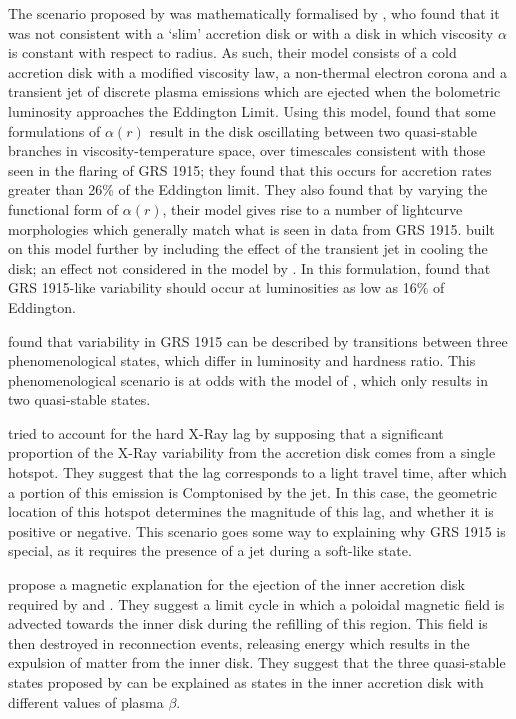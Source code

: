 \par The scenario proposed by \citealp{Belloni_Model1} was mathematically formalised by \citealp{Nayakshin_GRSModel}, who found that it was not consistent with a `slim' accretion disk \citep{Abramowicz_Slim} or with a disk in which viscosity $\alpha$ is constant with respect to radius.  As such, their model consists of a cold accretion disk with a modified viscosity law, a non-thermal electron corona and a transient jet of discrete plasma emissions which are ejected when the bolometric luminosity approaches the Eddington Limit.  Using this model, \citealp{Nayakshin_GRSModel} found that some formulations of $\alpha(r)$ result in the disk oscillating between two quasi-stable branches in viscosity-temperature space, over timescales consistent with those seen in the flaring of GRS 1915; they found that this occurs for accretion rates greater than 26\% of the Eddington limit.  They also found that by varying the functional form of $\alpha(r)$, their model gives rise to a number of lightcurve morphologies which generally match what is seen in data from GRS 1915.  \citealp{Janiuk_RadInstab} built on this model further by including the effect of the transient jet in cooling the disk; an effect not considered in the model by \citealp{Nayakshin_GRSModel}.  In this formulation, \citealp{Janiuk_RadInstab} found that GRS 1915-like variability should occur at luminosities as low as 16\% of Eddington.
\par \citealp{Belloni_GRS_MI} found that variability in GRS 1915 can be described by transitions between three phenomenological states, which differ in luminosity and hardness ratio.  This phenomenological scenario is at odds with the model of \citealp{Nayakshin_GRSModel}, which only results in two quasi-stable states.
\par \citealp{Nobili_Hotspot} tried to account for the hard X-Ray lag by supposing that a significant proportion of the X-Ray variability from the accretion disk comes from a single hotspot.  They suggest that the lag corresponds to a light travel time, after which a portion of this emission is Comptonised by the jet.  In this case, the geometric location of this hotspot determines the magnitude of this lag, and whether it is positive or negative.  This scenario goes some way to explaining why GRS 1915 is special, as it requires the presence of a jet during a soft-like state.
\par \citealp{Tagger_MagneticFlood} propose a magnetic explanation for the ejection of the inner accretion disk required by \citealp{Nayakshin_GRSModel} and \citealp{Janiuk_RadInstab}.  They suggest a limit cycle in which a poloidal magnetic field is advected towards the inner disk during the refilling of this region.  This field is then destroyed in reconnection events, releasing energy which results in the expulsion of matter from the inner disk.  They suggest that the three quasi-stable states proposed by \citealp{Belloni_GRS_MI} can be explained as states in the inner accretion disk with different values of plasma $\beta$.
